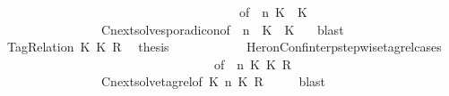 \begin{isabellebody}
\ \ \ \ \ \ \ \ \ \ \ \ \ \ \ \ \ \ \ \ \ \ \ \ \ \ \ \ \ \ \ \ \ \ \ \ \ \ {\isacharbrackleft}of\ {\isacartoucheopen}{\isasymGamma}{\isacartoucheclose}\ {\isacartoucheopen}n{\isacartoucheclose}\ {\isacartoucheopen}K{}{\isacartoucheclose}\ {\isacartoucheopen}{\isasymtau}{\isacartoucheclose}\ {\isacartoucheopen}K{}{\isacartoucheclose}\ {\isacartoucheopen}{\isasymPsi}{\isacartoucheclose}\ {\isacartoucheopen}{\isasymPhi}{\isacartoucheclose}{\isacharbrackright}\isanewline
\ \ \ \ \ \ \ \ \ \ \ \ \ \ \ \ Cnext{\isacharunderscore}solve{\isacharunderscore}sporadicon{\isacharbrackleft}of\ {\isacartoucheopen}{\isasymGamma}{\isacartoucheclose}\ {\isacartoucheopen}n{\isacartoucheclose}\ {\isacartoucheopen}{\isasymPsi}{\isacartoucheclose}\ {\isacartoucheopen}K{}{\isacartoucheclose}\ {\isacartoucheopen}{\isasymtau}{\isacartoucheclose}\ {\isacartoucheopen}K{}{\isacartoucheclose}\ {\isacartoucheopen}{\isasymPhi}{\isacartoucheclose}{\isacharbrackright}\ \isamarkupfalse%
\ blast\isanewline
\ \ \ \ \ \ \isamarkupfalse%
\isanewline
\ \ \ \ \ \ \ \ \isamarkupfalse%
\ {\isacharparenleft}TagRelation\ K\ K\ R{\isacharparenright}\ \isamarkupfalse%
\ {\isacharquery}thesis\isanewline
\ \ \ \ \ \ \ \ \ \ \isamarkupfalse%
\ HeronConf{\isacharunderscore}interp{\isacharunderscore}stepwise{\isacharunderscore}tagrel{\isacharunderscore}cases\isanewline
\ \ \ \ \ \ \ \ \ \ \ \ \ \ \ \ \ \ \ \ \ \ \ \ \ \ \ \ \ \ \ \ \ \ {\isacharbrackleft}of\ {\isacartoucheopen}{\isasymGamma}{\isacartoucheclose}\ {\isacartoucheopen}n{\isacartoucheclose}\ {\isacartoucheopen}K\ {\isacartoucheopen}K\ {\isacartoucheopen}R{\isacartoucheclose}\ {\isacartoucheopen}{\isasymPsi}{\isacartoucheclose}\ {\isacartoucheopen}{\isasymPhi}{\isacartoucheclose}{\isacharbrackright}\isanewline
\ \ \ \ \ \ \ \ \ \ \ \ \ \ \ \ Cnext{\isacharunderscore}solve{\isacharunderscore}tagrel{\isacharbrackleft}of\ {\isacartoucheopen}K\ {\isacartoucheopen}n{\isacartoucheclose}\ {\isacartoucheopen}K\ {\isacartoucheopen}R{\isacartoucheclose}\ {\isacartoucheopen}{\isasymGamma}{\isacartoucheclose}\ {\isacartoucheopen}{\isasymPsi}{\isacartoucheclose}\ {\isacartoucheopen}{\isasymPhi}{\isacartoucheclose}{\isacharbrackright}\ \isamarkupfalse%
\ blast\isanewline
\ \ \ \ \ \ \isamarkupfalse%

\end{isabellebody}
